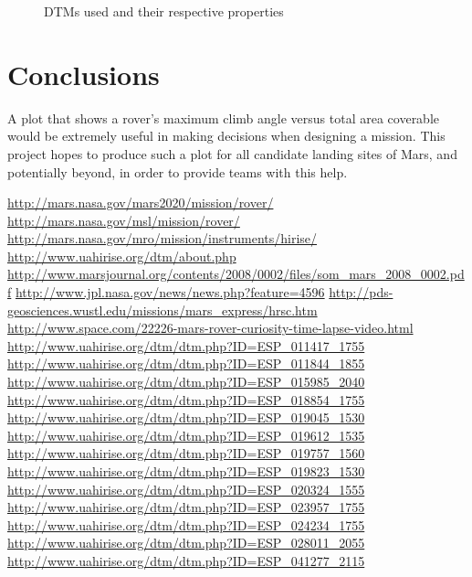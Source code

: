 \documentclass[12pt]{article}
\newcommand{\supcite}[1]{\textsuperscript{\cite{#1}}}
\begin{document}
\begin{figure}
\begin{tabular}[b]{c|c|c|c|c}
  \end{tabular}
  \caption{DTMs used and their respective properties}
  \label{fig:dtms}
\end{figure}

\section{Conclusions}
\label{sec:conclusions}
A plot that shows a rover's maximum climb angle versus total area coverable would be extremely useful in making decisions when designing a mission. This project hopes to produce such a plot for all candidate landing sites of Mars, and potentially beyond, in order to provide teams with this help.

\begin{thebibliography}{30}
  \url{http://mars.nasa.gov/mars2020/mission/rover/}
  \url{http://mars.nasa.gov/msl/mission/rover/}
  \url{http://mars.nasa.gov/mro/mission/instruments/hirise/}
  \url{http://www.uahirise.org/dtm/about.php}
  \url{http://www.marsjournal.org/contents/2008/0002/files/som_mars_2008_0002.pdf}
  \url{http://www.jpl.nasa.gov/news/news.php?feature=4596}
  \url{http://pds-geosciences.wustl.edu/missions/mars_express/hrsc.htm}
  \url{http://www.space.com/22226-mars-rover-curiosity-time-lapse-video.html}
  \url{http://www.uahirise.org/dtm/dtm.php?ID=ESP_011417_1755}
  \url{http://www.uahirise.org/dtm/dtm.php?ID=ESP_011844_1855}
  \url{http://www.uahirise.org/dtm/dtm.php?ID=ESP_015985_2040}
  \url{http://www.uahirise.org/dtm/dtm.php?ID=ESP_018854_1755}
  \url{http://www.uahirise.org/dtm/dtm.php?ID=ESP_019045_1530}
  \url{http://www.uahirise.org/dtm/dtm.php?ID=ESP_019612_1535}
  \url{http://www.uahirise.org/dtm/dtm.php?ID=ESP_019757_1560}
  \url{http://www.uahirise.org/dtm/dtm.php?ID=ESP_019823_1530}
  \url{http://www.uahirise.org/dtm/dtm.php?ID=ESP_020324_1555}
  \url{http://www.uahirise.org/dtm/dtm.php?ID=ESP_023957_1755}
  \url{http://www.uahirise.org/dtm/dtm.php?ID=ESP_024234_1755}
  \url{http://www.uahirise.org/dtm/dtm.php?ID=ESP_028011_2055}
  \url{http://www.uahirise.org/dtm/dtm.php?ID=ESP_041277_2115}
\end{thebibliography}
\end{document}
